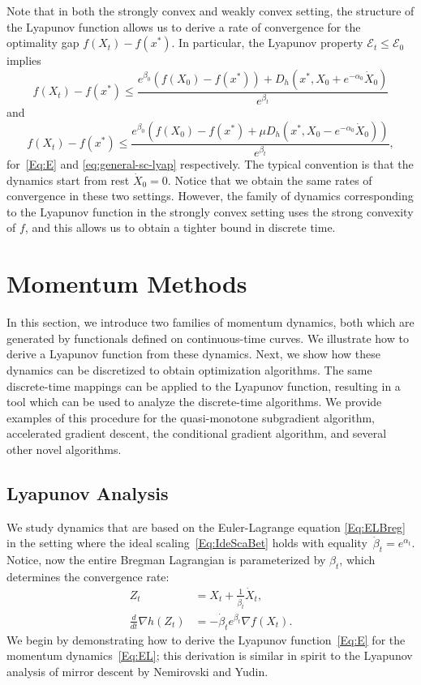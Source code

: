 \documentclass[11pt]{article}
\theoremstyle{plain}
\newcommand{\E}{{\mathcal E}}
\begin{document}
Note that in both the strongly convex and weakly convex setting, the structure of the Lyapunov function allows us to derive a rate of convergence for the optimality gap $f(X_t) - f(x^\ast)$. In particular, the Lyapunov property $\E_t \leq \E_0$ implies 
\begin{equation}\label{eq:Guarantee1}
f(X_t) - f(x^\ast) \leq \frac{e^{\beta_0}(f(X_0) - f(x^\ast)) + D_h(x^\ast, X_0 + e^{-\alpha_0} \dot X_0)}{e^{\beta_t}}
\end{equation}
and 
\begin{equation}
f(X_t) - f(x^\ast) \leq \frac{e^{\beta_0}(f(X_0) - f(x^\ast) +\mu D_h(x^\ast ,X_0 -e^{-\alpha_0} \dot X_0))}{e^{\beta_t}},
\end{equation}
for~\eqref{Eq:E} and \eqref{eq:general-sc-lyap} respectively. The typical convention is that the dynamics start from rest $\dot X_0 = 0$. Notice that we obtain the same rates of convergence in these two settings. However, the family of dynamics corresponding to the Lyapunov function in the strongly convex setting uses the strong convexity of $f$, and this allows us to obtain a tighter bound in discrete time.


\section{Momentum Methods}
\label{Sec:MomLyap}
In this section, we introduce two families of momentum dynamics, both which are generated by functionals defined on continuous-time curves. We illustrate how to derive a Lyapunov function from these dynamics. Next, we show how these dynamics can be discretized to obtain optimization algorithms. The same discrete-time mappings can be applied to the Lyapunov function, resulting in a tool which can be used to analyze the discrete-time algorithms. We provide examples of this procedure for the quasi-monotone subgradient algorithm, accelerated gradient descent, the conditional gradient algorithm, and several other novel algorithms. 
 \subsection{Lyapunov Analysis}
We study dynamics that are based on the Euler-Lagrange equation \eqref{Eq:ELBreg} in the setting where the ideal scaling~\eqref{Eq:IdeScaBet} holds with equality~$\dot \beta_t = e^{\alpha_t}$. Notice, now the entire Bregman Lagrangian is parameterized by $\beta_t$, which determines the convergence rate:
 \begin{subequations}\label{Eq:EL}
 \begin{align}
 Z_t &= X_t + \frac{1}{\dot \beta_t} \dot X_t \label{Eq:ELZ},\\
 \frac{d}{dt}\nabla h(Z_t) &= -\dot \beta_t e^{\beta_t} \nabla f(X_t)\label{Eq:ELH}.
 \end{align}
 \end{subequations}
We begin by demonstrating how to derive the Lyapunov function~\eqref{Eq:E} for the momentum dynamics~\eqref{Eq:EL}; this derivation is similar in spirit to the Lyapunov analysis of mirror descent by Nemirovski and Yudin.
  
\end{document}
